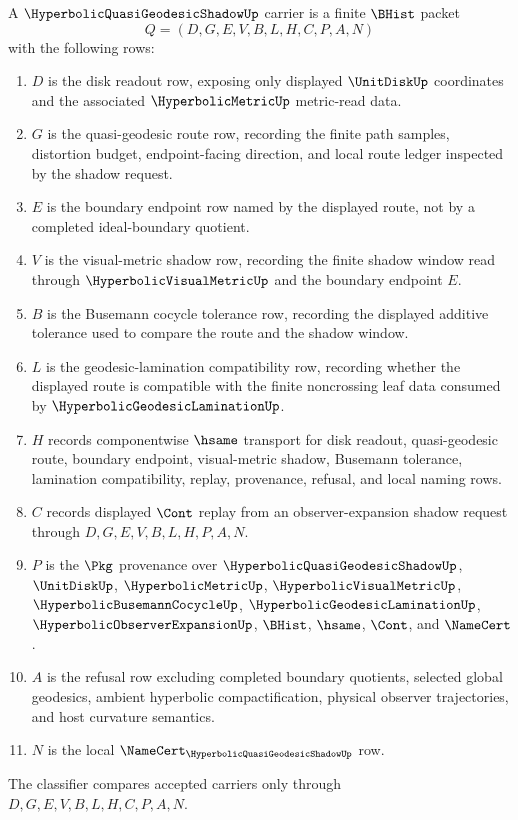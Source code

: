 \begin{definition}
\label{def:hyperbolic-quasi-geodesic-shadow-carrier}
A $\HyperbolicQuasiGeodesicShadowUp$ carrier is a finite $\BHist$ packet
$$
Q=(D,G,E,V,B,L,H,C,P,A,N)
$$
with the following rows:
\begin{enumerate}
\item $D$ is the disk readout row, exposing only displayed $\UnitDiskUp$ coordinates and the associated $\HyperbolicMetricUp$ metric-read data.
\item $G$ is the quasi-geodesic route row, recording the finite path samples, distortion budget, endpoint-facing direction, and local route ledger inspected by the shadow request.
\item $E$ is the boundary endpoint row named by the displayed route, not by a completed ideal-boundary quotient.
\item $V$ is the visual-metric shadow row, recording the finite shadow window read through $\HyperbolicVisualMetricUp$ and the boundary endpoint $E$.
\item $B$ is the Busemann cocycle tolerance row, recording the displayed additive tolerance used to compare the route and the shadow window.
\item $L$ is the geodesic-lamination compatibility row, recording whether the displayed route is compatible with the finite noncrossing leaf data consumed by $\HyperbolicGeodesicLaminationUp$.
\item $H$ records componentwise $\hsame$ transport for disk readout, quasi-geodesic route, boundary endpoint, visual-metric shadow, Busemann tolerance, lamination compatibility, replay, provenance, refusal, and local naming rows.
\item $C$ records displayed $\Cont$ replay from an observer-expansion shadow request through $D,G,E,V,B,L,H,P,A,N$.
\item $P$ is the $\Pkg$ provenance over $\HyperbolicQuasiGeodesicShadowUp$, $\UnitDiskUp$, $\HyperbolicMetricUp$, $\HyperbolicVisualMetricUp$, $\HyperbolicBusemannCocycleUp$, $\HyperbolicGeodesicLaminationUp$, $\HyperbolicObserverExpansionUp$, $\BHist$, $\hsame$, $\Cont$, and $\NameCert$.
\item $A$ is the refusal row excluding completed boundary quotients, selected global geodesics, ambient hyperbolic compactification, physical observer trajectories, and host curvature semantics.
\item $N$ is the local $\NameCert_{\HyperbolicQuasiGeodesicShadowUp}$ row.
\end{enumerate}
The classifier compares accepted carriers only through $D,G,E,V,B,L,H,C,P,A,N$.
\end{definition}

